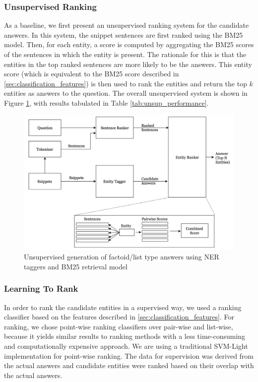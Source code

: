 \subsubsection{Unsupervised Ranking}

As a baseline, we first present an unsupervised ranking system for the candidate answers. In this system, the snippet sentences are first ranked using the BM25 model. Then, for each entity, a score is computed by aggregating the BM25 scores of the sentences in which the entity is present. The rationale for this is that the entities in the top ranked sentences are more likely to be the answers. This entity score (which is equivalent to the BM25 score described in \ref{sec:classification_features}) is then used to rank the entities and return the top $k$ entities as answers to the question. The overall unsupervised system is shown in Figure \ref{fig:UnsupervisedNERPipeline}, with results tabulated in Table \ref{tab:unsup_performance}.

\begin{figure}
    \centering
    \includegraphics[scale=0.5]{images/UnsupervisedNERPipeline.png}
    \caption{Unsupervised generation of factoid/list type answers using NER taggers and BM25 retrieval model}
    \label{fig:UnsupervisedNERPipeline}
\end{figure}

\subsubsection{Learning To Rank}

In order to rank the candidate entities in a supervised way, we used a ranking classifier based on the features described in \ref{sec:classification_features}. For ranking, we chose point-wise ranking classifiers over pair-wise and list-wise, because it yields similar results to ranking methods with a less time-consuming and computationally expensive approach. We are using a traditional SVM-Light \cite{svmlight} implementation for point-wise ranking. The data for supervision was derived from the actual answers and candidate entities were ranked based on their overlap with the actual answers. 

